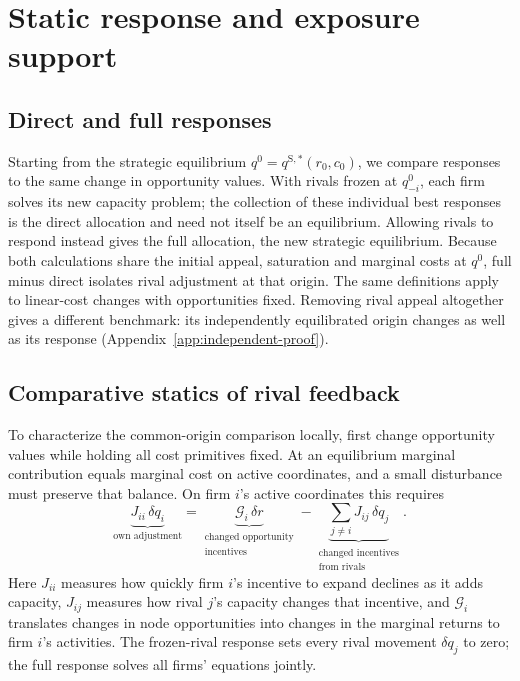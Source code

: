 \section{Static response and exposure support}\label{app:static-response}

\subsection{Direct and full responses}\label{sec:model-counterfactuals}

Starting from the strategic equilibrium
$q^0=q^{\mathrm S,*}(r_0,c_0)$, we compare responses to the same change in
opportunity values.
With rivals frozen at $q_{-i}^0$, each firm solves its new capacity problem;
the collection of these individual best responses is the direct allocation
and need not itself be an equilibrium.
Allowing rivals to respond instead gives the full allocation, the new
strategic equilibrium.
Because both calculations share the initial appeal, saturation and marginal
costs at $q^0$, full minus direct isolates rival adjustment at that origin.
The same definitions apply to linear-cost changes with opportunities fixed.
Removing rival appeal altogether gives a different benchmark: its
independently equilibrated origin changes as well as its response
(Appendix~\ref{app:independent-proof}).

\subsection{Comparative statics of rival feedback}\label{sec:model-response}

To characterize the common-origin comparison locally, first change
opportunity values while holding all cost primitives fixed.
At an equilibrium marginal contribution equals marginal cost on active
coordinates, and a small disturbance must preserve that balance.
On firm $i$'s active coordinates this requires
\begin{equation}\label{eq:firm-response}
  \underbrace{J_{ii}\,\delta q_i}_{\text{own adjustment}}
  =\underbrace{\mathcal G_i\,\delta r}
  _{\substack{\text{changed opportunity}\\\text{incentives}}}
  -\underbrace{\sum_{j\ne i}J_{ij}\,\delta q_j}
  _{\substack{\text{changed incentives}\\\text{from rivals}}}.
\end{equation}
Here $J_{ii}$ measures how quickly firm $i$'s incentive to expand declines as
it adds capacity, $J_{ij}$ measures how rival $j$'s capacity changes that
incentive, and $\mathcal G_i$ translates changes in node opportunities into
changes in the marginal returns to firm $i$'s activities.
The frozen-rival response sets every rival movement $\delta q_j$ to zero; the
full response solves all firms' equations jointly.

